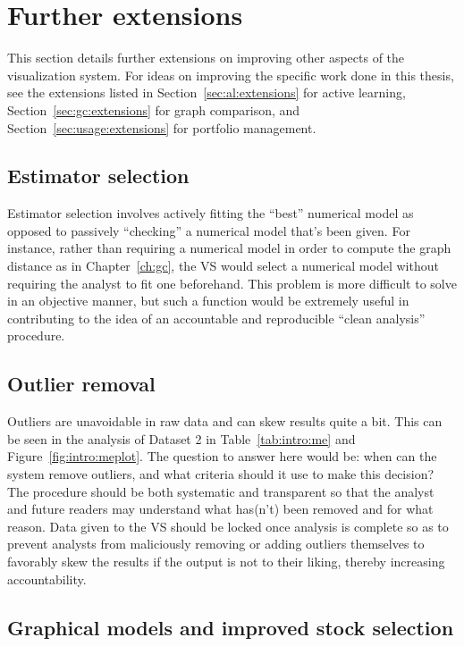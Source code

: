 \section{Further extensions}
\label{sec:futurework}

This section details further extensions on improving other aspects of the 
visualization system. For ideas on improving the specific work done in this 
thesis, see the extensions listed in Section~\ref{sec:al:extensions} for active 
learning, Section~\ref{sec:gc:extensions} for graph comparison, and 
Section~\ref{sec:usage:extensions} for portfolio management.

\subsection{Estimator selection}
\label{sec:futurework:estimatorselection}

Estimator selection involves actively fitting the ``best'' numerical model as 
opposed to passively
``checking'' a numerical model that's been given. For instance, rather than 
requiring a numerical model in order to compute the graph distance as in 
Chapter~\ref{ch:gc}, the VS would select a numerical model without requiring 
the analyst to fit one beforehand. This problem is more difficult
to solve in an objective manner, but such a function would be extremely useful 
in contributing to the idea of an accountable and reproducible ``clean 
analysis'' procedure.

\subsection{Outlier removal}
\label{sec:futurework:outlier}

Outliers are unavoidable in raw data and can skew results quite a bit. This can 
be seen in the analysis of Dataset 2 in Table~\ref{tab:intro:me} and 
Figure~\ref{fig:intro:meplot}. The question to answer here would be: when can 
the system remove outliers, and what criteria should it use to make this 
decision? The procedure should be both systematic and transparent so that the 
analyst and future readers may understand what has(n't) been removed and for 
what reason. Data given to the VS should be locked once analysis is complete so 
as to prevent analysts from maliciously removing or adding outliers themselves 
to favorably skew the results if the output is not to their liking, thereby 
increasing accountability. 

\subsection{Graphical models and improved stock selection}
\label{sec:futurework:graphicalmodel}

